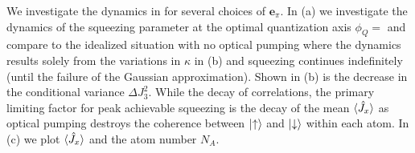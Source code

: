 \documentclass[preprint,aps,pra,onecolumn]{revtex4-1} %
\newcommand{\qaxis}{\mathbf{e}_\pi}
\newcommand{\varz}{\Delta J_3^2}
\begin{document}
We investigate the dynamics in  for several choices of $\qaxis$. In (a) we investigate the dynamics of the squeezing parameter at the optimal quantization axis $\phi_Q=$ and compare to the idealized situation with no optical pumping where the dynamics results solely from the variations in $\kappa$ in (b) and squeezing continues indefinitely (until the failure of the Gaussian approximation). Shown in (b) is the decrease in the conditional variance $\varz$. While the decay of correlations, the primary limiting factor for peak achievable squeezing is the decay of the mean $\langle{\hat{J}_x}\rangle$ as optical pumping destroys the coherence between $\lvert{\uparrow}\rangle$ and $\lvert{\downarrow}\rangle$ within each atom. In (c) we plot $\langle{\hat{J}_x}\rangle$ and the atom number $N_A$.  
\end{document}
